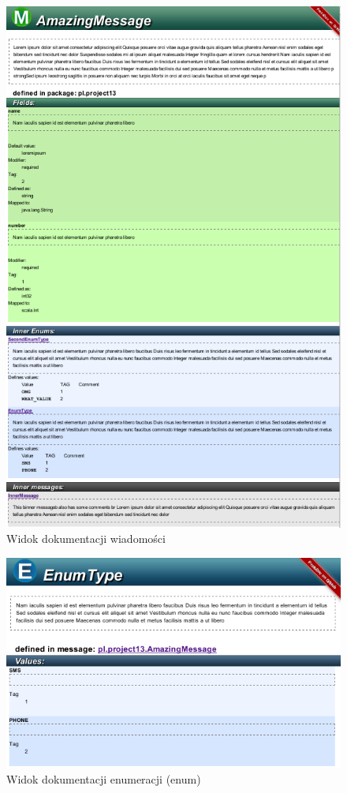 \documentclass[a4paper]{article}
\begin{document}
\begin{figure}[ch!]
 \centering
 \includegraphics[width=35em]{protodoc_msg}
 \caption{Widok dokumentacji wiadomości}
 \label{fig:protodoc_msg}
\end{figure}
\begin{figure}[ch!]
 \centering
 \includegraphics[width=35em]{protodoc_enum}
 \caption{Widok dokumentacji enumeracji (enum)}
 \label{fig:protodoc_enum}
\end{figure}
\end{document}
